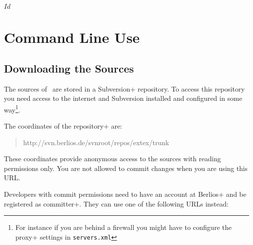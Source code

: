 \SVN$Id$

\section{Command Line Use}

\subsection{Downloading the Sources}

The sources of \ExTeX\ are stored in a \+Subversion+ repository. To
access this repository you need access to the internet and Subversion
installed and configured in some way\footnote{For instance if you are
  behind a firewall you might have to configure the \+proxy+ settings
  in \texttt{servers.xml}}.

The coordinates of the \+repository+ are:

\begin{quotation}
  http://svn.berlios.de/svnroot/repos/extex/trunk
\end{quotation}

These coordinates provide anonymous access to the sources with reading
permissions only. You are not allowed to commit changes when you are
using this URL.

Developers with commit permissions need to have an account at
\+Berlios+ and be registered as \+committer+. They can use one of the
following URLs instead:

